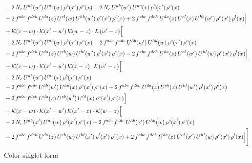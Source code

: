 \documentclass[9pt]{article}
\numberwithin{equation}{section}
\begin{document}
\begin{align}
& -2\,N_{c}\,U^{ab}(w')\,U^{ac}(w)\,\rho^{b}(x')\,\rho^{c}(x) +2\,N_{c}\,U^{ab}(w')\,U^{ac}(x)\,\rho^{b}(x')\,\rho^{c}(x)\notag\\
& -2\,f^{abc}\,f^{deh}\,U^{da}(z)\,U^{el}(w)\,U^{hb}(w')\,\rho^{c}(x')\,\rho^{l}(x) +2\,f^{abc}\,f^{deh}\,U^{da}(z)\,U^{el}(x)\,U^{hb}(w')\,\rho^{c}(x')\,\rho^{l}(x)\Big]\notag\\
& +\mathcal{K}(x-w)\cdot\mathcal{K}(x'-w')\,\mathcal{K}(w-z)\cdot\mathcal{K}(w'-z)\Big[\notag\\
& +2\,N_{c}\,U^{ab}(w')\,U^{ac}(w)\,\rho^{b}(x')\,\rho^{c}(x) +2\,f^{abc}\,f^{ade}\,U^{hb}(w')\,U^{hd}(w)\,\rho^{c}(x')\,\rho^{e}(x)\notag\\
& -2\,f^{abc}\,f^{deh}\,U^{da}(z)\,U^{eb}(w)\,U^{hl}(w')\,\rho^{l}(x')\,\rho^{c}(x) -2\,f^{abc}\,f^{deh}\,U^{da}(z)\,U^{eb}(w')\,U^{hl}(w)\,\rho^{c}(x')\,\rho^{l}(x)\Big]\notag\\
& +\mathcal{K}(x-w)\cdot\mathcal{K}(x'-w')\,\mathcal{K}(x-z)\cdot\mathcal{K}(w'-z)\Big[\notag\\
& -2\,N_{c}\,U^{ab}(w')\,U^{ac}(x)\,\rho^{b}(x')\,\rho^{c}(x)\notag\\
& -2\,f^{abc}\,f^{ade}\,U^{hb}(w')\,U^{hd}(x)\,\rho^{c}(x')\,\rho^{e}(x) +2\,f^{abc}\,f^{deh}\,U^{da}(z)\,U^{eb}(x)\,U^{hl}(w')\,\rho^{l}(x')\,\rho^{c}(x)\notag\\
& +2\,f^{abc}\,f^{deh}\,U^{da}(z)\,U^{eb}(w')\,U^{hl}(x)\,\rho^{c}(x')\,\rho^{l}(x)\Big]\notag\\
& +\mathcal{K}(x-w)\cdot\mathcal{K}(x'-w')\,\mathcal{K}(x'-z)\cdot\mathcal{K}(w-z)\Big[\notag\\
& -2\,N_{c}\,U^{ab}(x')\,U^{ac}(w)\,\rho^{b}(x')\,\rho^{c}(x) -2\,f^{abc}\,f^{ade}\,U^{hb}(x')\,U^{hd}(w)\,\rho^{c}(x')\,\rho^{e}(x)\notag\\
& +2\,f^{abc}\,f^{deh}\,U^{da}(z)\,U^{eb}(w)\,U^{hl}(x')\,\rho^{l}(x')\,\rho^{c}(x) +2\,f^{abc}\,f^{deh}\,U^{da}(z)\,U^{eb}(x')\,U^{hl}(w)\,\rho^{c}(x')\,\rho^{l}(x)\Big]\Bigg]
\end{align}
Color singlet form
\end{document}
